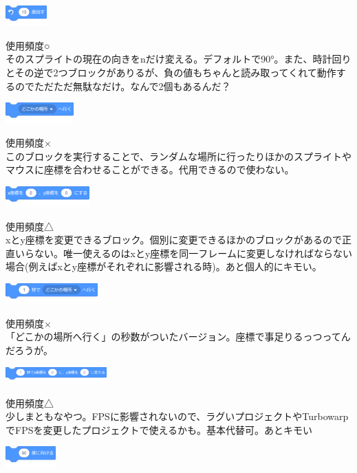 \documentclass[b5paper,10pt]{jsarticle}
\begin{document}
\begin{multicols*}{3}
\begin{itembox}{2}
\includegraphics[height=8mm]{images/motion_3.png}
\end{itembox}
使用頻度○\\
そのスプライトの現在の向きをnだけ変える。デフォルトで90°。また、時計回りとその逆で2つブロックがありるが、負の値もちゃんと読み取ってくれて動作するのでただただ無駄なだけ。なんで2個もあるんだ？
\begin{itembox}{3}
\includegraphics[height=8mm]{images/motion_4.png}
\end{itembox}
使用頻度×\\
このブロックを実行することで、ランダムな場所に行ったりほかのスプライトやマウスに座標を合わせることができる。代用できるので使わない。
\begin{itembox}{4}
\includegraphics[height=8mm]{images/motion_5.png}
\end{itembox}
使用頻度△\\
xとy座標を変更できるブロック。個別に変更できるほかのブロックがあるので正直いらない。唯一使えるのはxとy座標を同一フレームに変更しなければならない場合(例えばxとy座標がそれぞれに影響される時)。あと個人的にキモい。
\begin{itembox}{5}
\includegraphics[height=8mm]{images/motion_6.png}
\end{itembox}
使用頻度×\\
「どこかの場所へ行く」の秒数がついたバージョン。座標で事足りるっつってんだろうが。
\begin{itembox}{6}
\includegraphics[width=39mm]{images/motion_7.png}
\end{itembox}
使用頻度△\\
少しまともなやつ。FPSに影響されないので、ラグいプロジェクトやTurbowarpでFPSを変更したプロジェクトで使えるかも。基本代替可。あとキモい
\begin{itembox}{7}
\includegraphics[height=8mm]{images/motion_8.png}

\end{itembox}
\end{multicols*}
\end{document}
